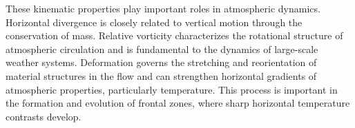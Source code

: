 \documentclass[10pt,twocolumn]{memoir}
\begin{document}
These kinematic properties play important roles in atmospheric dynamics. Horizontal divergence is closely related to vertical motion through the conservation of mass. Relative vorticity characterizes the rotational structure of atmospheric circulation and is fundamental to the dynamics of large-scale weather systems. Deformation governs the stretching and reorientation of material structures in the flow and can strengthen horizontal gradients of atmospheric properties, particularly temperature. This process is important in the formation and evolution of frontal zones, where sharp horizontal temperature contrasts develop.

\begin{figure}[h]
\centering
{}
\end{figure}
\end{document}
